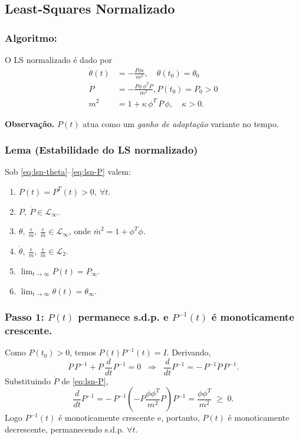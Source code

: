\documentclass[10pt]{article}
\begin{document}
\newpage

\subsection{Least-Squares Normalizado}\label{sec:ls-normalizado}

\subsubsection{Algoritmo:}
O LS normalizado é dado por
\begin{align}
    \dot{\theta}(t) &= -\frac{P\phi\epsilon}{m^2}, \quad \theta(t_0) = \theta_0
    \label{eq:lsn-theta}\\
    \dot{P} &= -\frac{P\phi\,\phi^T P}{m^2}, P(t_0) = P_0 > 0
    \label{eq:lsn-P}\\
    m^2 &=1+\kappa\,\phi^T\,P\,\phi, \quad \kappa>0.
\end{align}

\noindent\textbf{Observação.} \(P(t)\) atua como um \emph{ganho de adaptação} variante no tempo.

\subsubsection{Lema (Estabilidade do LS normalizado)}
Sob \eqref{eq:lsn-theta}–\eqref{eq:lsn-P} valem:
\begin{enumerate}
  \item \(P(t)=P^T(t)>0,\ \forall t\).
  \item \(P,\ \dot P\in \mathcal{L}_\infty\).
  \item \(\theta,\ \frac{\epsilon}{m},\ \frac{\epsilon}{\bar{m}}\in \mathcal{L}_\infty\), onde
        \(\bar m^2=1+\phi^T\phi\).
  \item \(\dot\theta,\ \frac{\epsilon}{m},\ \frac{\epsilon}{\bar{m}}\in \mathcal{L}_2\).
  \item \(\displaystyle \lim_{t\to\infty}P(t)=P_\infty\).
  \item \(\displaystyle \lim_{t\to\infty}\theta(t)=\theta_\infty\).
\end{enumerate}

\subsubsection*{Passo 1: \(P(t)\) permanece s.d.p. e \(P^{-1}(t)\) é monoticamente crescente.}

Como \(P(t_0)>0\), temos \(P(t)P^{-1}(t)=I\). Derivando,
\[
\dot P\,P^{-1} + P\,\frac{d}{dt}P^{-1}=0
\;\;\Rightarrow\;\;
\frac{d}{dt}P^{-1} = -\,P^{-1}\dot P\,P^{-1}.
\]
Substituindo \(\dot P\) de \eqref{eq:lsn-P},
\[
\frac{d}{dt}P^{-1}
= -\,P^{-1}\!\left(-P\frac{\phi\phi^T}{m^2}P\right)\!P^{-1}
= \frac{\phi\phi^T}{m^2}\;\geq\;0.
\]
Logo \(P^{-1}(t)\) é monoticamente crescente e, portanto,
\(P(t)\) é monoticamente decrescente, permanecendo s.d.p. \(\forall t\).
\end{document}
